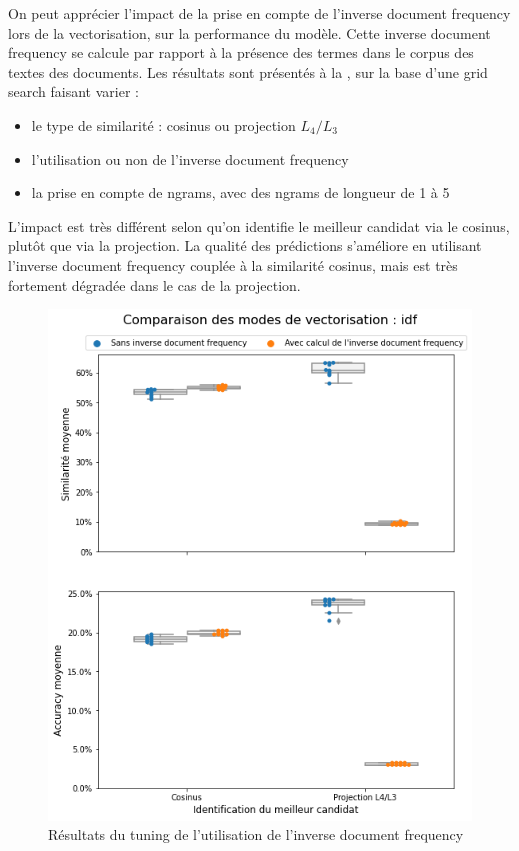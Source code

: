             On peut apprécier l'impact de la prise en compte de l'inverse document frequency lors de la vectorisation, sur la performance du modèle.
            Cette inverse document frequency se calcule par rapport à la présence des termes dans le corpus des textes des documents.
            Les résultats sont présentés à la , sur la base d'une grid search faisant varier : 
            \begin{itemize}
                \item le type de similarité : cosinus ou projection $L_{4}/L_{3}$
                \item l'utilisation ou non de l'inverse document frequency
                \item la prise en compte de ngrams, avec des ngrams de longueur de 1 à 5
            \end{itemize}
            L'impact est très différent selon qu'on identifie le meilleur candidat via le cosinus, plutôt que via la projection.
            La qualité des prédictions s'améliore en utilisant l'inverse document frequency couplée à la similarité cosinus, mais est très fortement dégradée dans le cas de la projection.

            \begin{figure}[htbp]
                \begin{center}
                \includegraphics[width=0.9\linewidth]{img/tuning_idf.png}
                \end{center}
                \caption{Résultats du tuning de l'utilisation de l'inverse document frequency}
                \label{fig:tuning_idf}
            \end{figure}

